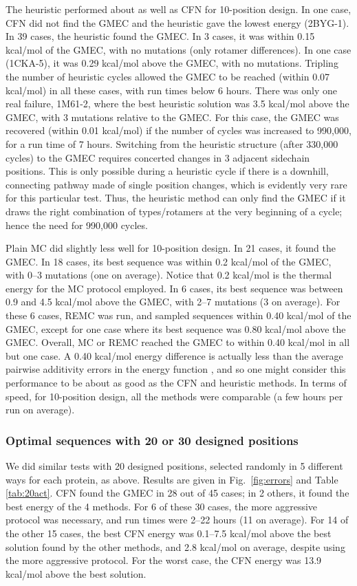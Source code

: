 \documentclass[a4paper,12pt]{article}
\begin{document}
The heuristic performed about as well as CFN for 10-position design. In one case, CFN did not find the GMEC and
the heuristic gave the lowest energy (2BYG-1). In 39 cases, the heuristic found the GMEC. In 3 cases, it was within
0.15 kcal/mol of the GMEC, with no mutations (only rotamer differences). In one case (1CKA-5), it was 0.29 kcal/mol
above the GMEC, with no mutations. Tripling the number of heuristic cycles allowed the GMEC to be reached (within
0.07 kcal/mol) in all these cases, with run times below 6 hours. There was only one real failure, 1M61-2, where
the best heuristic solution was 3.5 kcal/mol above the GMEC, with 3 mutations relative to the GMEC. For this case,
the GMEC was recovered (within 0.01 kcal/mol) if the number of cycles was increased to 990,000, for a run time of 7
hours. Switching from the heuristic structure (after 330,000 cycles) to the GMEC requires concerted changes in 3
adjacent sidechain positions. This is only possible during a heuristic cycle if there is a downhill, connecting pathway
made of single position changes, which is evidently very rare for this particular test. Thus, the heuristic method
can only find the GMEC if it draws the right combination of types/rotamers at the very beginning of a cycle; hence
the need for 990,000 cycles.

Plain MC did slightly less well for 10-position design. In 21 cases, it found the GMEC. In 18 cases, its best sequence
was within 0.2 kcal/mol of the GMEC, with 0--3 mutations (one on average). Notice that 0.2 kcal/mol is the thermal
energy for the MC protocol employed. In 6 cases, its best sequence was between 0.9 and 4.5 kcal/mol above the GMEC,
with 2--7 mutations (3 on average). For these 6 cases, REMC was run, and sampled sequences within 0.40 kcal/mol of
the GMEC, except for one case where its best sequence was 0.80 kcal/mol above the GMEC. Overall, MC or REMC reached
the GMEC to within 0.40 kcal/mol in all but one case. A 0.40 kcal/mol energy difference is actually less than the
average pairwise additivity errors in the energy function \cite{Lopes07,Schmidt08b,Gaillard14}, and so one might consider
this performance to be about as good as the CFN and heuristic methods. In terms of speed, for 10-position design,
all the methods were comparable (a few hours per run on average).

\subsubsection{Optimal sequences with 20 or 30 designed positions}
We did similar tests with 20 designed positions, selected randomly in 5 different ways for each protein, as above.
Results are given in Fig.\ \ref{fig:errors} and Table \ref{tab:20act}. CFN found the GMEC in 28 out of 45 cases;
in 2 others, it found the best energy of the 4 methods. For 6 of these 30 cases, the more aggressive protocol was
necessary, and run times were 2--22 hours (11 on average). For 14 of the other 15 cases, the best CFN energy was
0.1--7.5 kcal/mol above the best solution found by the other methods, and 2.8 kcal/mol on average, despite using the
more aggressive protocol. For the worst case, the CFN energy was 13.9 kcal/mol above the best solution.
\end{document}
